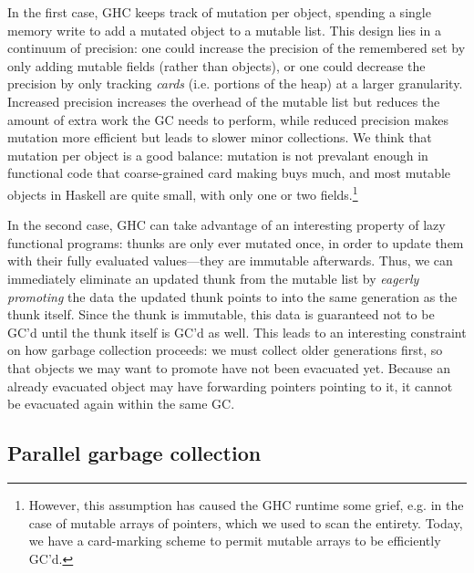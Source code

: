 In the first case, GHC keeps track of mutation per object, spending a
single memory write to add a mutated object to a mutable list.  This
design lies in a continuum of precision: one could increase the
precision of the remembered set by only adding mutable fields (rather
than objects), or one could decrease the precision by only tracking
\emph{cards} (i.e. portions of the heap) at a larger granularity.
Increased precision increases the overhead of the mutable list but
reduces the amount of extra work the GC needs to perform, while reduced
precision makes mutation more efficient but leads to slower minor
collections.  We think that mutation per object is a good balance: mutation
is not prevalant enough in functional code that coarse-grained card making
buys much, and most mutable objects in Haskell are quite small, with only
one or two fields.\footnote{However, this assumption has caused the GHC runtime
some grief, e.g. in the case of mutable arrays of pointers, which we used to
scan the entirety.  Today, we have a card-marking scheme to permit mutable
arrays to be efficiently GC'd.}

In the second case, GHC can take advantage of an interesting property of
lazy functional programs: thunks are only ever mutated once, in order to
update them with their fully evaluated values---they are immutable
afterwards.  Thus, we can immediately eliminate an updated thunk from
the mutable list by \emph{eagerly promoting} the data the updated thunk
points to into the same generation as the thunk itself.  Since the thunk
is immutable, this data is guaranteed not to be GC'd until the thunk
itself is GC'd as well.  This leads to an interesting constraint on how
garbage collection proceeds: we must collect older generations first, so
that objects we may want to promote have not been evacuated yet.
Because an already evacuated object may have forwarding pointers
pointing to it, it cannot be evacuated again within the same GC.



\subsection{Parallel garbage collection}

